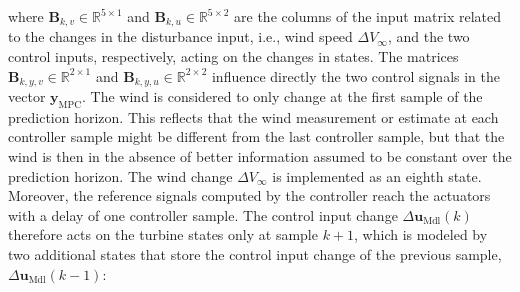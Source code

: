 where $\bm{B}_{k,v} \in \mathbb{R}^{5 \times 1}$ and $\bm{B}_{k,u} \in \mathbb{R}^{5 \times 2}$ are the columns of the input matrix related to the changes in the disturbance input, i.e., wind speed $\Delta V_{\infty}$, and the two control inputs, respectively, acting on the changes in states. The matrices $\bm{B}_{k,y,v} \in \mathbb{R}^{2 \times 1}$ and $\bm{B}_{k,y,u} \in \mathbb{R}^{2 \times 2}$ influence directly the two control signals in the vector $ \bm{y}_{\text{MPC}}$. The wind is considered to only change at the first sample of the prediction horizon. This reflects that the wind measurement or estimate at each controller sample might be different from the last controller sample, but that the wind is then in the absence of better information assumed to be constant over the prediction horizon. The wind change $\Delta V_{\infty}$ is implemented as an eighth state. Moreover, the reference signals computed by the controller reach the actuators with a delay of one controller sample. The control input change $\Delta \bm{u}_{\text{Mdl}}(k)$ therefore acts on the turbine states only at sample $k+1$, which is modeled by two additional states that store the control input change of the previous sample, $\Delta \bm{u}_{\text{Mdl}}(k-1)$:

